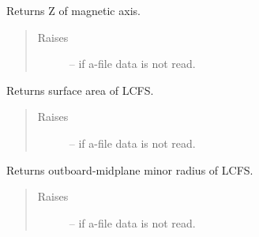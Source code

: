 \documentclass[letterpaper,10pt,english]{sphinxmanual}
\begin{document}
\begin{fulllineitems}
\begin{fulllineitems}
\begin{quote}
\begin{description}
\end{description}\end{quote}

\end{fulllineitems}


\begin{fulllineitems}
\label{eqtools:eqtools.eqdskreader.EqdskReader.getMagZ}
Returns Z of magnetic axis.
\begin{quote}\begin{description}
\item[{Raises }] \leavevmode
{} -- 
if a-file data is not read.

\end{description}\end{quote}

\end{fulllineitems}


\begin{fulllineitems}
\label{eqtools:eqtools.eqdskreader.EqdskReader.getAreaLCFS}
Returns surface area of LCFS.
\begin{quote}\begin{description}
\item[{Raises }] \leavevmode
{} -- 
if a-file data is not read.

\end{description}\end{quote}

\end{fulllineitems}


\begin{fulllineitems}
\label{eqtools:eqtools.eqdskreader.EqdskReader.getAOut}
Returns outboard-midplane minor radius of LCFS.
\begin{quote}\begin{description}
\item[{Raises }] \leavevmode
{} -- 
if a-file data is not read.

\end{description}\end{quote}


\end{fulllineitems}
\end{fulllineitems}
\end{document}
